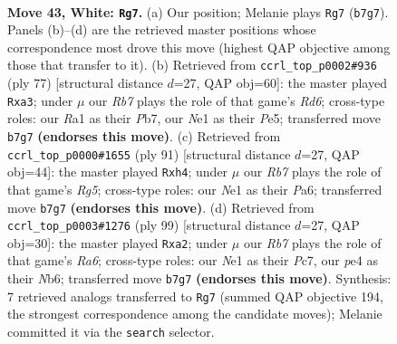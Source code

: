 \documentclass[11pt]{article}
\begin{document}
\clearpage

\begin{figure}[p]\centering
\begin{subfigure}{0.46\textwidth}\centering
\resizebox{\linewidth}{!}{%
\newchessgame
\chessboard[
  setfen={8/pR6/8/2p2p1P/2k1p3/8/1P6/R2KN2r w - - 3 43},
  showmover=false,
  pgfstyle=straightmove, color=movearrow, markmove={b7-g7}
]}
\caption{}
\end{subfigure}\hfill
\begin{subfigure}{0.46\textwidth}\centering
\resizebox{\linewidth}{!}{%
\newchessgame
\chessboard[
  setfen={8/1pp5/8/3kpR2/7P/P2rP3/5P2/5K2 b - - 0 39},
  showmover=false,
  pgfstyle=straightmove, color=movearrow, markmove={d3-a3}
]}
\caption{}
\end{subfigure}
\\[4pt]
\begin{subfigure}{0.46\textwidth}\centering
\resizebox{\linewidth}{!}{%
\newchessgame
\chessboard[
  setfen={8/6p1/p1k5/R2p4/3P2rP/2PK4/7P/8 b - - 0 46},
  showmover=false,
  pgfstyle=straightmove, color=movearrow, markmove={g4-h4}
]}
\caption{}
\end{subfigure}\hfill
\begin{subfigure}{0.46\textwidth}\centering
\resizebox{\linewidth}{!}{%
\newchessgame
\chessboard[
  setfen={8/2p1R3/1n6/p5p1/2PK4/r5k1/P2N4/8 b - - 5 50},
  showmover=false,
  pgfstyle=straightmove, color=movearrow, markmove={a3-a2}
]}
\caption{}
\end{subfigure}
\caption{\textbf{Move 43, White: \texttt{Rg7}.} (a) Our position; Melanie plays \texttt{Rg7} (\texttt{b7g7}). Panels (b)--(d) are the retrieved master positions whose correspondence most drove this move (highest QAP objective among those that transfer to it). (b) Retrieved from \texttt{ccrl\_top\_p0002\#936} (ply 77) [structural distance $d$=27, QAP obj=60]: the master played \texttt{Rxa3}; under $\mu$ our \emph{Rb7} plays the role of that game's \emph{Rd6}; cross-type roles: our \emph{R}a1 as their \emph{P}b7, our \emph{N}e1 as their \emph{P}e5; transferred move \texttt{b7g7} \textbf{(endorses this move)}. (c) Retrieved from \texttt{ccrl\_top\_p0000\#1655} (ply 91) [structural distance $d$=27, QAP obj=44]: the master played \texttt{Rxh4}; under $\mu$ our \emph{Rb7} plays the role of that game's \emph{Rg5}; cross-type roles: our \emph{N}e1 as their \emph{P}a6; transferred move \texttt{b7g7} \textbf{(endorses this move)}. (d) Retrieved from \texttt{ccrl\_top\_p0003\#1276} (ply 99) [structural distance $d$=27, QAP obj=30]: the master played \texttt{Rxa2}; under $\mu$ our \emph{Rb7} plays the role of that game's \emph{Ra6}; cross-type roles: our \emph{N}e1 as their \emph{P}c7, our \emph{p}e4 as their \emph{N}b6; transferred move \texttt{b7g7} \textbf{(endorses this move)}. Synthesis: 7 retrieved analogs transferred to \texttt{Rg7} (summed QAP objective 194, the strongest correspondence among the candidate moves); Melanie committed it via the \texttt{search} selector.}
\label{fig:thought-m84}
\end{figure}
\end{document}
